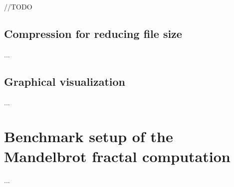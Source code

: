 //TODO

\newpage

\subsection{Compression for reducing file size}

...

\subsection{Graphical visualization} \label{subsection:frontend}

...\newpage

\section{Benchmark setup of the Mandelbrot fractal computation}

...
